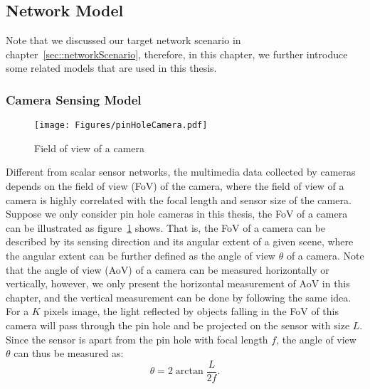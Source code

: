 \subsection{Network Model}
\label{sec::dataModel}
Note that we discussed our target network scenario in chapter~\ref{sec::networkScenario}, therefore, in this chapter, we further introduce some related models that are used in this thesis.
%
%
\subsubsection{Camera Sensing Model}
\begin{figure}
\begin{center}
\texttt{[image: Figures/pinHoleCamera.pdf]}
\caption{\label{fig::fov}Field of view of a camera}
\end{center}
\end{figure}
Different from scalar sensor networks, the multimedia data collected by cameras depends on the field of view (FoV) of the camera, where the field of view of a camera is highly correlated with the focal length and sensor size of the camera.
Suppose we only consider pin hole cameras in this thesis, the FoV of a camera can be illustrated as figure~\ref{fig::fov} shows.
That is, the FoV of a camera can be described by its sensing direction and its angular extent of a given scene, where the angular extent can be further defined as the angle of view $\theta$ of a camera.
Note that the angle of view (AoV) of a camera can be measured horizontally or vertically, however, we only present the horizontal measurement of AoV in this chapter, and the vertical measurement can be done by following the same idea.
For a $K$ pixels image, the light reflected by objects falling in the FoV of this camera will pass through the pin hole and be projected on the sensor with size $L$.
Since the sensor is apart from the pin hole with focal length $f$, the angle of view $\theta$ can thus be measured as:
\begin{equation}
\theta = 2 \arctan \frac{L}{2f}.
\label{eq::AoV}
\end{equation}
%
